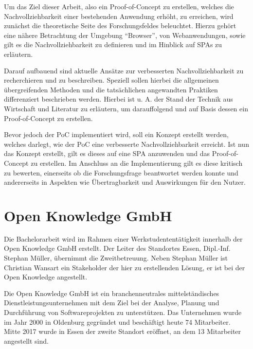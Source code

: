 Um das Ziel dieser Arbeit, also ein Proof-of-Concept zu erstellen, welches die Nachvollziehbarkeit einer bestehenden Anwendung erhöht, zu erreichen, wird zunächst die theoretische Seite des Forschungsfeldes beleuchtet. Hierzu gehört eine nähere Betrachtung der Umgebung \enquote{Browser}, von Webanwendungen, sowie gilt es die Nachvollziehbarkeit zu definieren und im Hinblick auf SPAs zu erläutern.

Darauf aufbauend sind aktuelle Ansätze zur verbesserten Nachvollziehbarkeit zu recherchieren und zu beschreiben. Speziell sollen hierbei die allgemeinen übergreifenden Methoden und die tatsächlichen angewandten Praktiken differenziert beschrieben werden. Hierbei ist u. A. der Stand der Technik aus Wirtschaft und Literatur zu erläutern, um darauffolgend und auf Basis dessen ein Proof-of-Concept zu erstellen.

Bevor jedoch der PoC implementiert wird, soll ein Konzept erstellt werden, welches darlegt, wie der PoC eine verbesserte Nachvollziehbarkeit erreicht. Ist nun das Konzept erstellt, gilt es dieses auf eine SPA anzuwenden und das Proof-of-Concept zu erstellen. Im Anschluss an die Implementierung gilt es diese kritisch zu bewerten, einerseits ob die Forschungsfrage beantwortet werden konnte und andererseits in Aspekten wie Übertragbarkeit und Auswirkungen für den Nutzer.

\vspace{-0.25\baselineskip}

\section{Open Knowledge GmbH}

\vspace{-0.50\baselineskip}

Die Bachelorarbeit wird im Rahmen einer Werkstudententätigkeit innerhalb der Open Knowledge GmbH erstellt. Der Leiter des Standortes Essen, Dipl.-Inf. Stephan Müller, übernimmt die Zweitbetreuung. Neben Stephan Müller ist Christian Wansart ein Stakeholder der hier zu erstellenden Lösung, er ist bei der Open Knowledge angestellt.

Die Open Knowledge GmbH ist ein branchenneutrales mittelständisches Dienstleistungsunternehmen mit dem Ziel bei der Analyse, Planung und Durchführung von Softwareprojekten zu unterstützen. Das Unternehmen wurde im Jahr 2000 in Oldenburg gegründet und beschäftigt heute 74 Mitarbeiter. Mitte 2017 wurde in Essen der zweite Standort eröffnet, an dem 13 Mitarbeiter angestellt sind.

